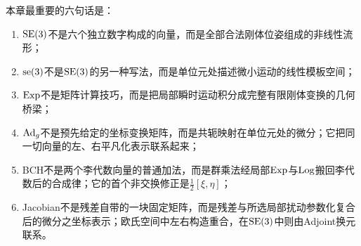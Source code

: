 本章最重要的六句话是：
\begin{enumerate}
    \item $\operatorname{SE}(3)$不是六个独立数字构成的向量，而是全部合法刚体位姿组成的非线性流形；
    \item $\operatorname{se}(3)$不是$\operatorname{SE}(3)$的另一种写法，而是单位元处描述微小运动的线性模板空间；
    \item $\operatorname{Exp}$不是矩阵计算技巧，而是把局部瞬时运动积分成完整有限刚体变换的几何桥梁；
    \item $\operatorname{Ad}_g$不是预先给定的坐标变换矩阵，而是共轭映射在单位元处的微分；它把同一切向量的左、右平凡化表示联系起来；
    \item BCH不是两个李代数向量的普通加法，而是群乘法经局部$\operatorname{Exp}$与$\operatorname{Log}$搬回李代数后的合成律；它的首个非交换修正是$\frac12[\xi,\eta]$；
    \item Jacobian不是残差自带的一块固定矩阵，而是残差与所选局部扰动参数化复合后的微分之坐标表示；欧氏空间中左右构造重合，在$\operatorname{SE}(3)$中则由Adjoint换元联系。
\end{enumerate}
